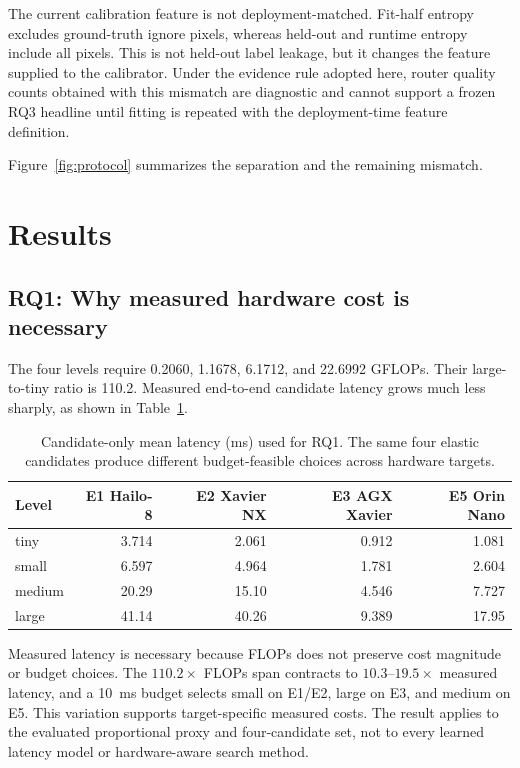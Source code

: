 \documentclass[a4paper,review,12pt]{elsarticle}
\begin{document}
The current calibration feature is not deployment-matched. Fit-half entropy excludes ground-truth ignore pixels, whereas held-out and runtime entropy include all pixels. This is not held-out label leakage, but it changes the feature supplied to the calibrator. Under the evidence rule adopted here, router quality counts obtained with this mismatch are diagnostic and cannot support a frozen RQ3 headline until fitting is repeated with the deployment-time feature definition.

Figure~\ref{fig:protocol} summarizes the separation and the remaining mismatch.



\section{Results}
\label{sec:results}

\subsection{RQ1: Why measured hardware cost is necessary}

The four levels require 0.2060, 1.1678, 6.1712, and 22.6992 GFLOPs. Their large-to-tiny ratio is 110.2. Measured end-to-end candidate latency grows much less sharply, as shown in Table~\ref{tab:latency}.

\begin{table}[t]
\centering
\caption{Candidate-only mean latency (ms) used for RQ1. The same four elastic candidates produce different budget-feasible choices across hardware targets.}
\label{tab:latency}
\begin{tabular}{@{}lrrrr@{}}
\toprule
Level & E1 Hailo-8 & E2 Xavier NX & E3 AGX Xavier & E5 Orin Nano \\
\midrule
tiny & 3.714 & 2.061 & 0.912 & 1.081 \\
small & 6.597 & 4.964 & 1.781 & 2.604 \\
medium & 20.29 & 15.10 & 4.546 & 7.727 \\
large & 41.14 & 40.26 & 9.389 & 17.95 \\
\bottomrule
\end{tabular}
\end{table}

Measured latency is necessary because FLOPs does not preserve cost magnitude or budget choices. The $110.2\times$ FLOPs span contracts to $10.3$--$19.5\times$ measured latency, and a 10~ms budget selects small on E1/E2, large on E3, and medium on E5. This variation supports target-specific measured costs. The result applies to the evaluated proportional proxy and four-candidate set, not to every learned latency model or hardware-aware search method.
\end{document}
